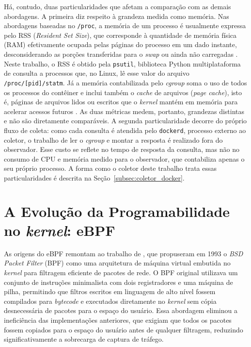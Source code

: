 Há, contudo, duas particularidades que afetam a comparação com as demais abordagens. A primeira diz respeito à grandeza medida como memória. Nas abordagens baseadas no \texttt{/proc}, a memória de um processo é usualmente expressa pelo RSS (\textit{Resident Set Size}), que corresponde à quantidade de memória física (RAM) efetivamente ocupada pelas páginas do processo em um dado instante, desconsiderando as porções transferidas para o \textit{swap} ou ainda não carregadas \cite{linux_proc_man}. Neste trabalho, o RSS é obtido pela \texttt{psutil}, biblioteca Python multiplataforma de consulta a processos que, no Linux, lê esse valor do arquivo \texttt{/proc/[pid]/statm}. Já a memória contabilizada pelo \textit{cgroup} soma o uso de todos os processos do contêiner e inclui também o \textit{cache} de arquivos (\textit{page cache}), isto é, páginas de arquivos lidos ou escritos que o \textit{kernel} mantém em memória para acelerar acessos futuros \cite{kernel_cgroup_v2}. As duas métricas medem, portanto, grandezas distintas e não são diretamente comparáveis. A segunda particularidade decorre do próprio fluxo de coleta: como cada consulta é atendida pelo \texttt{dockerd}, processo externo ao coletor, o trabalho de ler o \textit{cgroup} e montar a resposta é realizado fora do observador. Esse custo se reflete no tempo de resposta da consulta, mas não no consumo de CPU e memória medido para o observador, que contabiliza apenas o seu próprio processo. A forma como o coletor deste trabalho trata essas particularidades é descrita na Seção~\ref{subsec:coletor_docker}.

\section{A Evolução da Programabilidade no \textit{kernel}: eBPF}
\label{sec:ebpf}

As origens do eBPF remontam ao trabalho de , que propuseram em 1993 o \textit{BSD Packet Filter} (BPF) como uma arquitetura de máquina virtual embutida no \textit{kernel} para filtragem eficiente de pacotes de rede. O BPF original utilizava um conjunto de instruções minimalista com dois registradores e uma máquina de pilha, permitindo que filtros escritos em linguagem de alto nível fossem compilados para \textit{bytecode} e executados diretamente no \textit{kernel} sem cópia desnecessária de pacotes para o espaço do usuário. Essa abordagem eliminou a ineficiência das implementações anteriores, que exigiam que todos os pacotes fossem copiados para o espaço do usuário antes de qualquer filtragem, reduzindo significativamente a sobrecarga de captura de tráfego.

